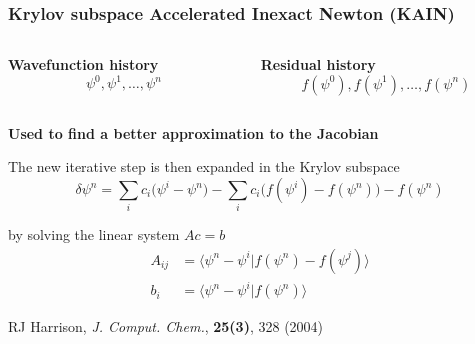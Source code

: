 \documentclass[mathserif, 10pt]{beamer}
\begin{document}
\begin{frame}
    \frametitle{Krylov subspace Accelerated Inexact Newton (KAIN)}
    \begin{columns}
    \begin{column}[b]{0.5\textwidth}
    \centering
    \textbf{Wavefunction history}
    \begin{equation}
	\nonumber
	\psi^0, \psi^1, \dots, \psi^n
    \end{equation}
    \end{column}
    \begin{column}[b]{0.5\textwidth}
    \centering
    \textbf{Residual history}
    \begin{equation}
	\nonumber
	f(\psi^0), f(\psi^1), \dots, f(\psi^n)
    \end{equation}
    \end{column}
    \end{columns}

    \vspace{5mm}

    \centering
    \textbf{Used to find a better approximation to the Jacobian}

    \vspace{10mm}

    The new iterative step is then expanded in the Krylov subspace
    \begin{equation}
	\nonumber
	\delta\psi^n = \sum_i c_i\Big(\psi^i-\psi^n\Big) - 
	\sum_i c_i\Big(f(\psi^i) - f(\psi^n)\Big) - f(\psi^n)
    \end{equation}

    \vspace{5mm}

    by solving the linear system $Ac = b$
    \begin{align}
	\nonumber
	A_{ij} &= \langle\psi^n-\psi^i|f(\psi^n) - f(\psi^j)\rangle\\
	\nonumber
	b_{i}  &= \langle\psi^n-\psi^i|f(\psi^n)\rangle
    \end{align}

    \vspace{5mm}

    \centering
    \tiny
    RJ Harrison,
    {\it J. Comput. Chem.}, 
    \textbf{25(3)},
    328 (2004)
\end{frame}
\end{document}
